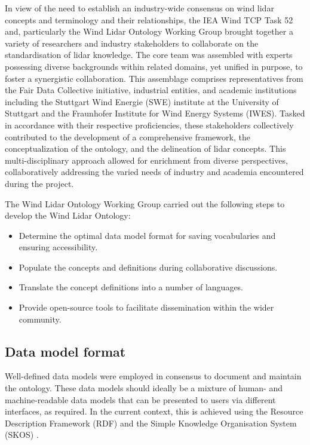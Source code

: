 \documentclass[remotesensing,article,submit,pdftex,moreauthors]{Definitions/mdpi}
\begin{document}
In view of the need to establish an industry-wide consensus on wind lidar concepts and terminology
and their relationships, the IEA Wind TCP Task 52 and,
particularly the Wind Lidar Ontology Working Group \cite{ref-IEA-Wind-Task-52-OntologyGroup}
brought together a variety of researchers and industry stakeholders to collaborate on the
standardisation of lidar knowledge. The core team was assembled with experts possessing
diverse backgrounds within related domains, yet unified in purpose, to foster a synergistic collaboration.
This assemblage comprises representatives from the Fair Data Collective initiative, industrial entities,
and academic institutions including the Stuttgart Wind Energie (SWE) institute at the University
of Stuttgart and the Fraunhofer Institute for Wind Energy Systems (IWES). Tasked in accordance with
their respective proficiencies, these stakeholders collectively contributed to the development of
a comprehensive framework, the conceptualization of the ontology, and the delineation of lidar concepts.
This multi-disciplinary approach allowed for enrichment from diverse perspectives,
collaboratively addressing the varied needs of industry and academia encountered during the project. 

The Wind Lidar Ontology Working Group carried out the following steps to develop
the Wind Lidar Ontology:
\begin{itemize}
    \item Determine the optimal data model format for saving vocabularies and ensuring accessibility.
    \item Populate the concepts and definitions during collaborative discussions.
    \item Translate the concept definitions into a number of languages.
    \item Provide open-source tools to facilitate dissemination within the wider community.
\end{itemize}


\subsection{Data model format}
Well-defined data models were employed in consensus to document and maintain the ontology.
These data models should ideally be a mixture of human- and machine-readable data models that can be presented to users via different interfaces, as required. In the current context, this is achieved using the Resource Description Framework (RDF) \cite{ref-W3C-RDF} and the Simple Knowledge Organisation System (SKOS) \cite{ref-W3C-SKOS}.
\end{document}
